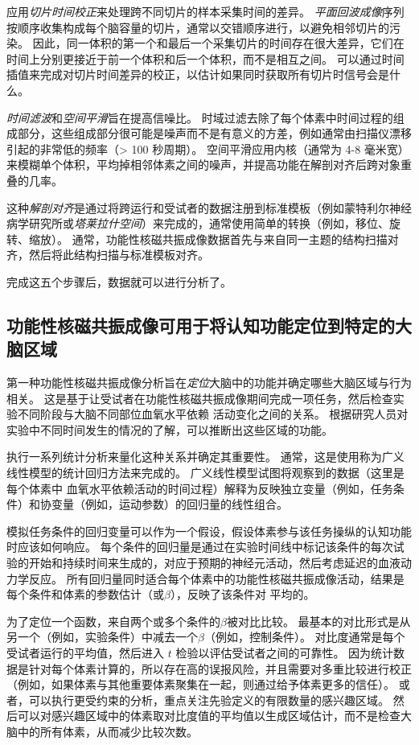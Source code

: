 应用\textit{切片时间校正}来处理跨不同切片的样本采集时间的差异。
\textit{平面回波成像}序列按顺序收集构成每个脑容量的切片，通常以交错顺序进行，以避免相邻切片的污染。
因此，同一体积的第一个和最后一个采集切片的时间存在很大差异，它们在时间上分别更接近于前一个体积和后一个体积，而不是相互之间。
可以通过时间插值来完成对切片时间差异的校正，以估计如果同时获取所有切片时信号会是什么。


\textit{时间滤波}和\textit{空间平滑}旨在提高信噪比。
时域过滤去除了每个体素中时间过程的组成部分，这些组成部分很可能是噪声而不是有意义的方差，例如通常由扫描仪漂移引起的非常低的频率（> 100 秒周期）。 
空间平滑应用内核（通常为 4-8 毫米宽）来模糊单个体积，平均掉相邻体素之间的噪声，并提高功能在解剖对齐后跨对象重叠的几率。


这种\textit{解剖对齐}是通过将跨运行和受试者的数据注册到标准模板（例如蒙特利尔神经病学研究所或\textit{塔莱拉什空间}）来完成的，通常使用简单的转换（例如，移位、旋转、缩放）。
通常，功能性核磁共振成像数据首先与来自同一主题的结构扫描对齐，然后将此结构扫描与标准模板对齐。


完成这五个步骤后，数据就可以进行分析了。



\subsection{功能性核磁共振成像可用于将认知功能定位到特定的大脑区域}

第一种功能性核磁共振成像分析旨在\textit{定位}大脑中的功能并确定哪些大脑区域与行为相关。 
这是基于让受试者在功能性核磁共振成像期间完成一项任务，然后检查实验不同阶段与大脑不同部位血氧水平依赖 活动变化之间的关系。 
根据研究人员对实验中不同时间发生的情况的了解，可以推断出这些区域的功能。


执行一系列统计分析来量化这种关系并确定其重要性。 
通常，这是使用称为广义线性模型的统计回归方法来完成的。 
广义线性模型试图将观察到的数据（这里是每个体素中 血氧水平依赖活动的时间过程）解释为反映独立变量（例如，任务条件）和协变量（例如，运动参数）的回归量的线性组合。


模拟任务条件的回归变量可以作为一个假设，假设体素参与该任务操纵的认知功能时应该如何响应。
每个条件的回归量是通过在实验时间线中标记该条件的每次试验的开始和持续时间来生成的，对应于预期的神经元活动，然后考虑延迟的血液动力学反应。
所有回归量同时适合每个体素中的功能性核磁共振成像活动，结果是每个条件和体素的参数估计（或$\beta$），反映了该条件对 平均的。


为了定位一个函数，来自两个或多个条件的$\beta$被对比比较。 
最基本的对比形式是从另一个（例如，实验条件）中减去一个$\beta$（例如，控制条件）。 
对比度通常是每个受试者运行的平均值，然后进入 $t$ 检验以评估受试者之间的可靠性。 
因为统计数据是针对每个体素计算的，所以存在高的误报风险，并且需要对多重比较进行校正（例如，如果体素与其他重要体素聚集在一起，则通过给予体素更多的信任）。 
或者，可以执行更受约束的分析，重点关注先验定义的有限数量的感兴趣区域。 
然后可以对感兴趣区域中的体素取对比度值的平均值以生成区域估计，而不是检查大脑中的所有体素，从而减少比较次数。


